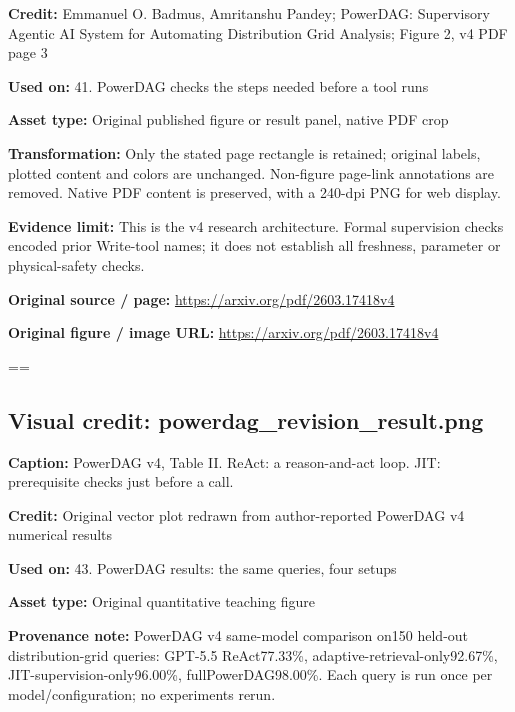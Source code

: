 \documentclass[10pt,letterpaper]{article}
\begin{document}
\textbf{Credit:} Emmanuel O. Badmus, Amritanshu Pandey; PowerDAG: Supervisory Agentic AI System for Automating Distribution Grid Analysis; Figure 2, v4 PDF page 3\par
\textbf{Used on:} 41. PowerDAG checks the steps needed before a tool runs\par
\textbf{Asset type:} Original published figure or result panel, native PDF crop\par
\textbf{Transformation:} Only the stated page rectangle is retained; original labels, plotted content and colors are unchanged. Non-figure page-link annotations are removed. Native PDF content is preserved, with a 240-dpi PNG for web display.\par
\textbf{Evidence limit:} This is the v4 research architecture. Formal supervision checks encoded prior Write-tool names; it does not establish all freshness, parameter or physical-safety checks.\par
\textbf{Original source / page:} \href{https://arxiv.org/pdf/2603.17418v4}{\small\ttfamily https:/\allowbreak{}/\allowbreak{}arxiv.\allowbreak{}org/\allowbreak{}pdf/\allowbreak{}2603.\allowbreak{}17418v4}\par
\textbf{Original figure / image URL:} \href{https://arxiv.org/pdf/2603.17418v4}{\small\ttfamily https:/\allowbreak{}/\allowbreak{}arxiv.\allowbreak{}org/\allowbreak{}pdf/\allowbreak{}2603.\allowbreak{}17418v4}\par
\egroup\par\noindent\box\readingEntry\par\medskip
\setbox\readingEntry=\vbox\bgroup\hsize=\linewidth\subsection*{Visual credit: powerdag\_revision\_result.png}
\textbf{Caption:} PowerDAG v4, Table II. ReAct: a reason-and-act loop. JIT: prerequisite checks just before a call.\par
\textbf{Credit:} Original vector plot redrawn from author-reported PowerDAG v4 numerical results\par
\textbf{Used on:} 43. PowerDAG results: the same queries, four setups\par
\textbf{Asset type:} Original quantitative teaching figure\par
\textbf{Provenance note:} PowerDAG v4 same-model comparison on150 held-out distribution-grid queries: GPT-5.5 ReAct77.33\%, adaptive-retrieval-only92.67\%, JIT-supervision-only96.00\%, fullPowerDAG98.00\%. Each query is run once per model/configuration; no experiments rerun.\par
\end{document}
